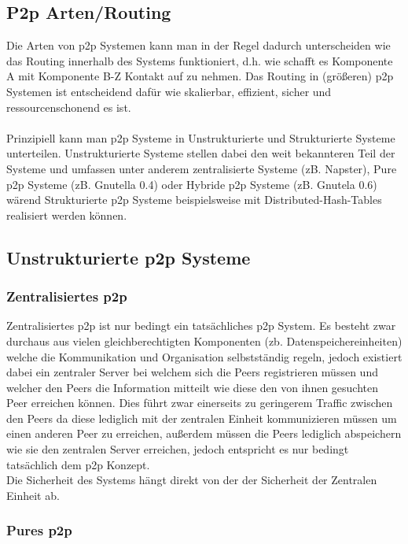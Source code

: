 \documentclass[a4paper,12pt]{scrreprt}
\begin{document}
			\subsection{P2p Arten/Routing}
			
				Die Arten von p2p Systemen kann man in der Regel dadurch unterscheiden wie das Routing innerhalb des Systems funktioniert, d.h. wie schafft es Komponente A mit Komponente B-Z Kontakt auf zu nehmen. Das Routing in (größeren) p2p Systemen ist entscheidend dafür wie skalierbar, effizient, sicher und ressourcenschonend es ist.
				\\\\Prinzipiell kann man p2p Systeme in Unstrukturierte und Strukturierte Systeme unterteilen. Unstrukturierte Systeme stellen dabei den weit bekannteren Teil der Systeme und umfassen unter anderem zentralisierte Systeme (zB. Napster), Pure p2p Systeme (zB. Gnutella 0.4) oder Hybride p2p Systeme (zB. Gnutela 0.6) wärend Strukturierte p2p Systeme beispielsweise mit Distributed-Hash-Tables realisiert werden können. %
				
			\subsection{Unstrukturierte p2p Systeme}
				\subsubsection{Zentralisiertes p2p}
					
					Zentralisiertes p2p ist nur bedingt ein tatsächliches p2p System. Es besteht zwar durchaus aus vielen gleichberechtigten Komponenten (zb. Datenspeichereinheiten) welche die Kommunikation und Organisation selbstständig regeln, jedoch existiert dabei ein zentraler Server bei welchem sich die Peers registrieren müssen und welcher den Peers die Information mitteilt wie diese den von ihnen gesuchten Peer erreichen können. Dies führt zwar einerseits zu geringerem Traffic zwischen den Peers da diese lediglich mit der zentralen Einheit kommunizieren müssen um einen anderen Peer zu erreichen, außerdem müssen die Peers lediglich abspeichern wie sie den zentralen Server erreichen, jedoch entspricht es nur bedingt tatsächlich dem p2p Konzept.\\
					Die Sicherheit des Systems hängt direkt von der der Sicherheit der Zentralen Einheit ab.
					
				\subsubsection{Pures p2p}
					
\end{document}
